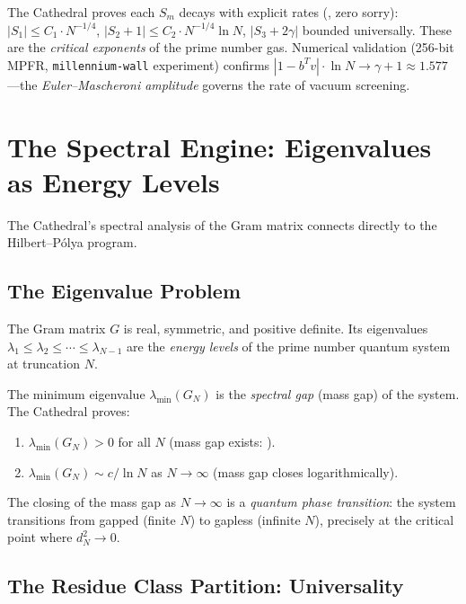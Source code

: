 \documentclass[11pt,a4paper]{article}
\begin{document}
The Cathedral proves each $S_m$ decays with explicit rates
(, zero sorry):
$|S_1| \leq C_1 \cdot N^{-1/4}$,
$|S_2 + 1| \leq C_2 \cdot N^{-1/4} \ln N$,
$|S_3 + 2\gamma|$ bounded universally.
These are the \emph{critical exponents} of the prime number gas.
Numerical validation (256-bit MPFR, \texttt{millennium-wall} experiment)
confirms $|1 - b^T v| \cdot \ln N \to \gamma + 1 \approx 1.577$---the
\emph{Euler--Mascheroni amplitude} governs the rate of vacuum screening.

\section{The Spectral Engine: Eigenvalues as Energy Levels}
\label{sec:spectral}

The Cathedral's spectral analysis of the Gram matrix connects directly
to the Hilbert--P\'olya program.

\subsection{The Eigenvalue Problem}

The Gram matrix $G$ is real, symmetric, and positive definite. Its
eigenvalues $\lambda_1 \leq \lambda_2 \leq \cdots \leq \lambda_{N-1}$
are the \emph{energy levels} of the prime number quantum system at
truncation $N$.

\begin{correspondence}[Spectral Gap = Mass Gap]
The minimum eigenvalue $\lambda_{\min}(G_N)$ is the \emph{spectral gap}
(mass gap) of the system. The Cathedral proves:
\begin{enumerate}
  \item $\lambda_{\min}(G_N) > 0$ for all $N$ (mass gap exists:
    ).
  \item $\lambda_{\min}(G_N) \sim c/\ln N$ as $N \to \infty$
    (mass gap closes logarithmically).
\end{enumerate}
The closing of the mass gap as $N \to \infty$ is a \emph{quantum
phase transition}: the system transitions from gapped (finite $N$)
to gapless (infinite $N$), precisely at the critical point where
$d_N^2 \to 0$.
\end{correspondence}

\subsection{The Residue Class Partition: Universality}
\label{sec:universality}
\end{document}
